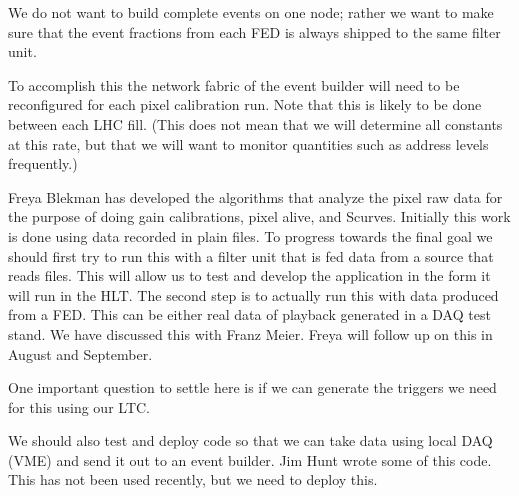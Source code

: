 
We do not want to build complete events on one node; rather we want to
make sure that the event fractions from each FED is always shipped to
the same filter unit.

To accomplish this the network fabric of the event 
builder will need to be reconfigured for each pixel
calibration run. Note that this is likely to be done
between each LHC fill. (This does not mean that we
will determine all constants at this rate, but that
we will want to monitor quantities such as address
levels frequently.)

Freya Blekman has developed the algorithms that analyze 
the pixel raw data for the purpose of doing gain calibrations,
pixel alive, and Scurves. Initially this work is 
done using data recorded in plain files. To progress
towards the final goal we should first try to run this
with a filter unit that is fed data from a source
that reads files. This will allow us to test and develop
the application in the form it will run in the HLT. The
second step is to actually run this with data produced 
from a FED. This can be either real data of playback 
generated in a DAQ test stand. We have discussed this 
with Franz Meier. Freya will follow up on this in
August and September.

One important question to settle here is if we can generate
the triggers we need for this using our LTC. 

We should also test and deploy code so that we can take 
data using local DAQ (VME) and send it out to an event builder.
Jim Hunt wrote some of this code. This has not been used
recently, but we need to deploy this.


